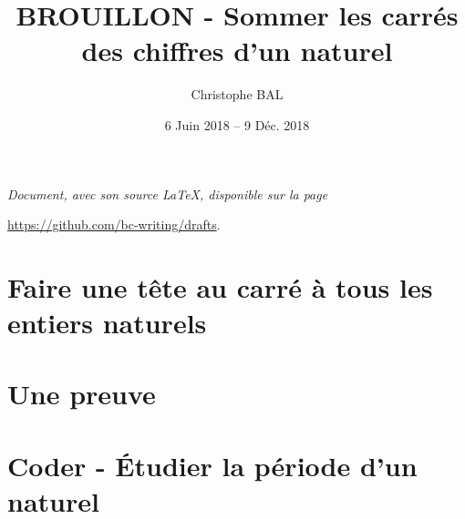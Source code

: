 \documentclass[12pt]{amsart}
\begin{document}
\title{BROUILLON - Sommer les carrés des chiffres d'un naturel}
\author{Christophe BAL}
\date{6 Juin 2018 -- 9 Déc. 2018}

\maketitle

\begin{center}
	\itshape
	Document, avec son source \LaTeX, disponible sur la page
	
	\url{https://github.com/bc-writing/drafts}.
\end{center}



\setcounter{tocdepth}{1}
\tableofcontents



\section{Faire une tête au carré à tous les entiers naturels}




\section{Une preuve}\label{proof}




\section{Coder - Étudier la \og période \fg{} d'un naturel}


\end{document}
